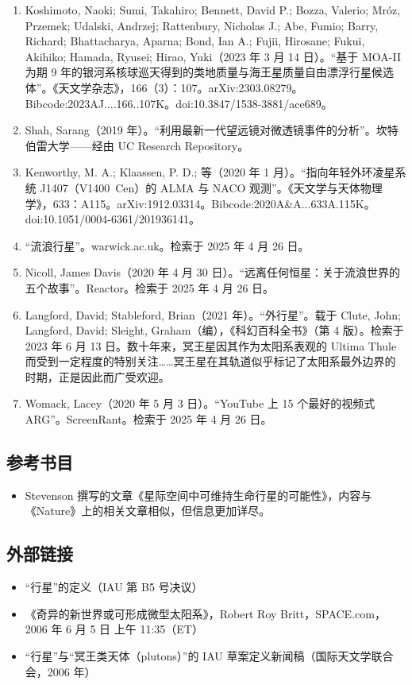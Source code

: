 \begin{enumerate}
\item Koshimoto, Naoki; Sumi, Takahiro; Bennett, David P.; Bozza, Valerio; Mróz, Przemek; Udalski, Andrzej; Rattenbury, Nicholas J.; Abe, Fumio; Barry, Richard; Bhattacharya, Aparna; Bond, Ian A.; Fujii, Hirosane; Fukui, Akihiko; Hamada, Ryusei; Hirao, Yuki（2023 年 3 月 14 日）。“基于 MOA-II 为期 9 年的银河系核球巡天得到的类地质量与海王星质量自由漂浮行星候选体”。《天文学杂志》，166（3）：107。arXiv:2303.08279。Bibcode:2023AJ....166..107K。doi:10.3847/1538-3881/ace689。  
\item Shah, Sarang（2019 年）。“利用最新一代望远镜对微透镜事件的分析”。坎特伯雷大学——经由 UC Research Repository。  
\item Kenworthy, M. A.; Klaassen, P. D.; 等（2020 年 1 月）。“指向年轻外环凌星系统 J1407（V1400~Cen）的 ALMA 与 NACO 观测”。《天文学与天体物理学》，633：A115。arXiv:1912.03314。Bibcode:2020A\&A...633A.115K。doi:10.1051/0004-6361/201936141。  
\item “流浪行星”。warwick.ac.uk。检索于 2025 年 4 月 26 日。  
\item Nicoll, James Davis（2020 年 4 月 30 日）。“远离任何恒星：关于流浪世界的五个故事”。Reactor。检索于 2025 年 4 月 26 日。  
\item Langford, David; Stableford, Brian（2021 年）。“外行星”。载于 Clute, John; Langford, David; Sleight, Graham（编），《科幻百科全书》（第 4 版）。检索于 2023 年 6 月 13 日。数十年来，冥王星因其作为太阳系表观的 Ultima Thule 而受到一定程度的特别关注……冥王星在其轨道似乎标记了太阳系最外边界的时期，正是因此而广受欢迎。  
\item Womack, Lacey（2020 年 5 月 3 日）。“YouTube 上 15 个最好的视频式 ARG”。ScreenRant。检索于 2025 年 4 月 26 日。
\end{enumerate}
\subsection{参考书目}
\begin{itemize}
\item Stevenson 撰写的文章《星际空间中可维持生命行星的可能性》，内容与《Nature》上的相关文章相似，但信息更加详尽。  
\end{itemize}
\subsection{外部链接}
\begin{itemize}
\item “行星”的定义（IAU 第 B5 号决议）  
\item 《奇异的新世界或可形成微型太阳系》，Robert Roy Britt，SPACE.com，2006 年 6 月 5 日 上午 11:35（ET）  
\item “行星”与“冥王类天体（plutons）”的 IAU 草案定义新闻稿（国际天文学联合会，2006 年）
\end{itemize}


